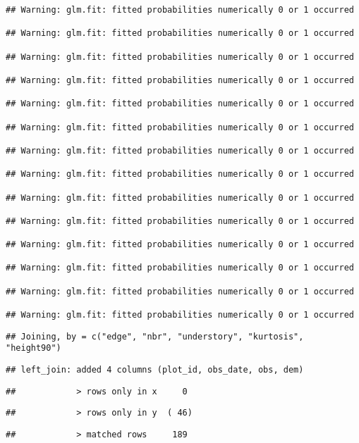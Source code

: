 \documentclass[
]{article}
\begin{document}
\begin{verbatim}
## Warning: glm.fit: fitted probabilities numerically 0 or 1 occurred

## Warning: glm.fit: fitted probabilities numerically 0 or 1 occurred

## Warning: glm.fit: fitted probabilities numerically 0 or 1 occurred

## Warning: glm.fit: fitted probabilities numerically 0 or 1 occurred

## Warning: glm.fit: fitted probabilities numerically 0 or 1 occurred

## Warning: glm.fit: fitted probabilities numerically 0 or 1 occurred

## Warning: glm.fit: fitted probabilities numerically 0 or 1 occurred

## Warning: glm.fit: fitted probabilities numerically 0 or 1 occurred

## Warning: glm.fit: fitted probabilities numerically 0 or 1 occurred

## Warning: glm.fit: fitted probabilities numerically 0 or 1 occurred

## Warning: glm.fit: fitted probabilities numerically 0 or 1 occurred

## Warning: glm.fit: fitted probabilities numerically 0 or 1 occurred

## Warning: glm.fit: fitted probabilities numerically 0 or 1 occurred

## Warning: glm.fit: fitted probabilities numerically 0 or 1 occurred
\end{verbatim}

\begin{verbatim}
## Joining, by = c("edge", "nbr", "understory", "kurtosis", "height90")
\end{verbatim}

\begin{verbatim}
## left_join: added 4 columns (plot_id, obs_date, obs, dem)
\end{verbatim}

\begin{verbatim}
##            > rows only in x     0
\end{verbatim}

\begin{verbatim}
##            > rows only in y  ( 46)
\end{verbatim}

\begin{verbatim}
##            > matched rows     189
\end{verbatim}
\end{document}
